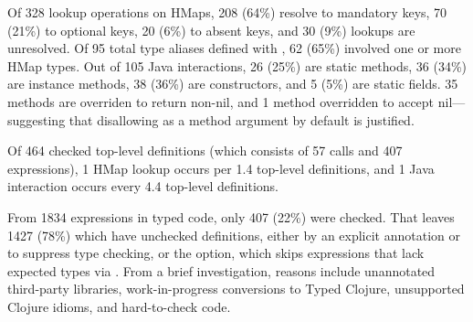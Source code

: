 \documentclass[9pt]{extarticle}
\begin{document}


Of 328 lookup operations on HMaps,
208 (64\%) resolve to mandatory keys,
70 (21\%) to optional keys,
20 (6\%) to absent keys, and
30 (9\%) lookups are unresolved.
%
Of 95 total type aliases defined with ,
62 (65\%) involved one or more HMap types.
%
%
%
%
%
%
%
%
Out of 105 Java interactions, 26 (25\%) are static methods, 36 (34\%)
are instance methods, 38 (36\%) are constructors, and 5 (5\%) are static
fields. 35 methods are overriden to return non-nil, and 1 method 
overridden to accept nil---suggesting that
\coretyped{} disallowing  as a method argument by default
is justified.

Of 464 checked top-level definitions (which consists of
57  calls and 407  expressions),
1 HMap lookup occurs per 1.4 top-level definitions,
and 1 Java interaction occurs every 4.4 top-level definitions.

From 1834  expressions in typed code,
only 407 (22\%) were checked.
That leaves 1427 (78\%) which have unchecked definitions, either by an explicit  annotation
or  to suppress type checking,
or the  option, which skips  expressions
that lack expected types via .
From a brief investigation,
reasons include unannotated third-party libraries,
work-in-progress conversions to Typed Clojure,
unsupported Clojure idioms, 
and hard-to-check code.
\end{document}
